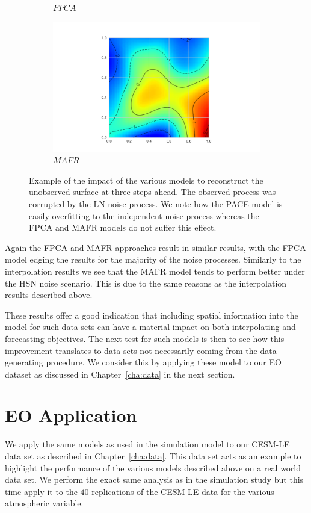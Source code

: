 \begin{figure}
\begin{subfigure}[b]{0.45\textwidth}
		\caption{$FPCA$}
		\label{fig:ftsm_res_recon_fpca}
	\end{subfigure}
	\begin{subfigure}[b]{0.45\textwidth}
		\includegraphics[width=\textwidth]{ftsm_res_recon_example_mafr}
		\caption{$MAFR$}
		\label{fig:ftsm_res_recon_mafr}
	\end{subfigure}  
	\caption[Example of the impact of the various models to reconstruct the unobserved surface at three steps ahead.]{Example of the impact of the various models to reconstruct the unobserved surface at three steps ahead. The observed process was corrupted by the LN noise process. We note how the PACE model is easily overfitting to the independent noise process whereas the FPCA and MAFR models do not suffer this effect.}
	\label{fig:ftsm_res_recon}
\end{figure}

Again the FPCA and MAFR approaches result in similar results, with the FPCA model edging the results for the majority of the noise processes.
Similarly to the interpolation results we see that the MAFR model tends to perform better under the HSN noise scenario. 
This is due to the same reasons as the interpolation results described above. 

These results offer a good indication that including spatial information into the model for such data sets can have a material impact on both interpolating and forecasting objectives. 
The next test for such models is then to see how this improvement translates to data sets not necessarily coming from the data generating procedure.
We consider this by applying these model to our EO dataset as discussed in Chapter~\ref{cha:data} in the next section. 

\section{EO Application \label{sec:ftsm_eo}}
We apply the same models as used in the simulation model to our CESM-LE data set as described in Chapter~\ref{cha:data}.
This data set acts as an example to highlight the performance of the various models described above on a real world data set. 
We perform the exact same analysis as in the simulation study but this time apply it to the $40$ replications of the CESM-LE data for the various atmospheric variable. 

